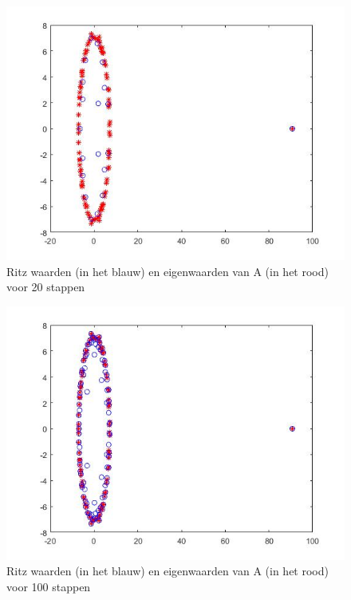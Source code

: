\documentclass[a4paper]{article}
\begin{document}
\begin{figure}
\caption{Ritz waarden (in het blauw) en eigenwaarden van A (in het rood) voor 20 stappen}
\includegraphics[width=\textwidth, height=0.3\textheight]{RITZ20.JPG}
\end{figure}
\begin{figure}
\caption{Ritz waarden (in het blauw) en eigenwaarden van A (in het rood) voor 100 stappen}
\includegraphics[width=\textwidth, height=0.3\textheight]{RITZ100.JPG}
\end{figure}
\end{document}
